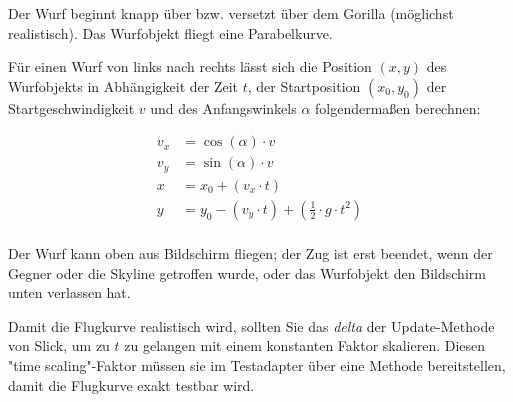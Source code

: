 Der Wurf beginnt knapp über bzw. versetzt über dem Gorilla (möglichst realistisch). Das Wurfobjekt fliegt eine Parabelkurve.

Für einen Wurf von links nach rechts lässt sich die Position $(x, y)$ des Wurfobjekts in Abhängigkeit der Zeit $t$, der Startposition $(x_0, y_0)$ der Startgeschwindigkeit $v$ und des Anfangswinkels $\alpha$ folgendermaßen berechnen: 

\begin{align*}
v_x &= \cos (\alpha) \cdot v \\
v_y &= \sin (\alpha) \cdot v \\
x &= x_0 + (v_x \cdot t) \\
y &= y_0 - (v_y \cdot t) + (\frac{1}{2} \cdot g \cdot t^2) \\
\end{align*}

Der Wurf kann oben aus Bildschirm fliegen; der Zug ist erst beendet, wenn der Gegner oder die Skyline getroffen wurde, oder das Wurfobjekt den Bildschirm unten verlassen hat.

Damit die Flugkurve realistisch wird, sollten Sie das \textit{delta} der Update-Methode von Slick, um zu $t$ zu gelangen mit einem konstanten Faktor skalieren. Diesen "time scaling"-Faktor müssen sie im Testadapter über eine Methode bereitstellen, damit die Flugkurve exakt testbar wird.